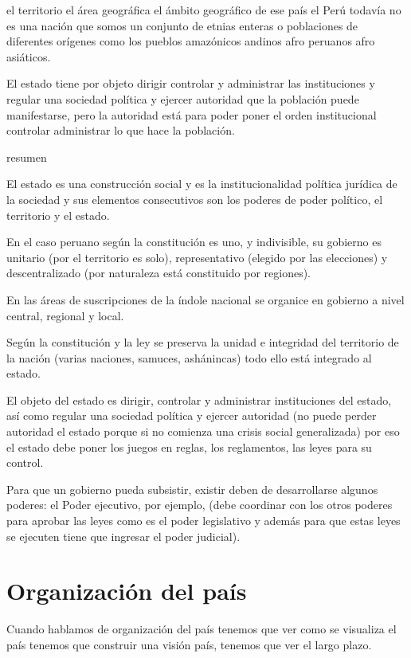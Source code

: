 \documentclass[
  jou,
  floatsintext,
  longtable,
  a4paper,
  nolmodern,
  notxfonts,
  notimes,
  12pt,
  colorlinks=true,linkcolor=blue,citecolor=blue,urlcolor=blue]{apa7}
\begin{document}
el territorio el área geográfica el ámbito geográfico de ese país el
Perú todavía no es una nación que somos un conjunto de etnias enteras o
poblaciones de diferentes orígenes como los pueblos amazónicos andinos
afro peruanos afro asiáticos.

El estado tiene por objeto dirigir controlar y administrar las
instituciones y regular una sociedad política y ejercer autoridad que la
población puede manifestarse, pero la autoridad está para poder poner el
orden institucional controlar administrar lo que hace la población.

resumen

El estado es una construcción social y es la institucionalidad política
jurídica de la sociedad y sus elementos consecutivos son los poderes de
poder político, el territorio y el estado.

En el caso peruano según la constitución es uno, y indivisible, su
gobierno es unitario (por el territorio es solo), representativo
(elegido por las elecciones) y descentralizado (por naturaleza está
constituido por regiones).

En las áreas de suscripciones de la índole nacional se organice en
gobierno a nivel central, regional y local.

Según la constitución y la ley se preserva la unidad e integridad del
territorio de la nación (varias naciones, samuces, ashánincas) todo ello
está integrado al estado.

El objeto del estado es dirigir, controlar y administrar instituciones
del estado, así como regular una sociedad política y ejercer autoridad
(no puede perder autoridad el estado porque si no comienza una crisis
social generalizada) por eso el estado debe poner los juegos en reglas,
los reglamentos, las leyes para su control.

Para que un gobierno pueda subsistir, existir deben de desarrollarse
algunos poderes: el Poder ejecutivo, por ejemplo, (debe coordinar con
los otros poderes para aprobar las leyes como es el poder legislativo y
además para que estas leyes se ejecuten tiene que ingresar el poder
judicial).

\section{Organización del país}\label{organizaciuxf3n-del-pauxeds}

Cuando hablamos de organización del país tenemos que ver como se
visualiza el país tenemos que construir una visión país, tenemos que ver
el largo plazo.
\end{document}

